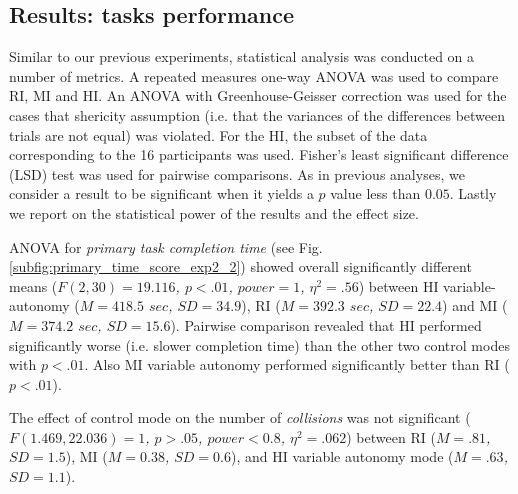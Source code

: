 \documentclass[a4paper,12pt,oneside,openright]{bhamthesis}
\begin{document}
 
\subsection{Results: tasks performance}
\label{chapter5:sim_results_system}
Similar to our previous experiments, statistical analysis was conducted on a number of metrics. A repeated measures one-way ANOVA was used to compare RI, MI and HI. An ANOVA with Greenhouse-Geisser correction was used for the cases that shericity assumption (i.e. that the variances of the differences between trials are not equal) was violated. For the HI, the subset of the data corresponding to the 16 participants was used. Fisher's least significant difference (LSD) test was used for pairwise comparisons. As in previous analyses, we consider a result to be significant when it yields a $p$ value less than $0.05$. Lastly we report on the statistical power of the results and the effect size.

ANOVA for \textit{primary task completion time} (see Fig. \ref{subfig:primary_time_score_exp2_2}) showed overall significantly different means (\textit{$F(2, 30) = 19.116$,  $p < .01$, $power = 1$, $\eta^2 = .56$}) between HI variable-autonomy (\textit{$M = 418.5$ $sec$, $SD = 34.9$}), RI (\textit{$M = 392.3$ $sec$, $SD = 22.4$}) and MI (\textit{$M = 374.2$ $sec$, $SD = 15.6$}). Pairwise comparison revealed that HI performed significantly worse (i.e. slower completion time) than the other two control modes with \textit{$p <.01$}. Also MI variable autonomy performed significantly better than RI (\textit{$p <.01$}). 

The effect of control mode on the number of \textit{collisions} was not significant (\textit{$F(1.469, 22.036) = 1$, $p > .05$, $power < 0.8$, $\eta^2 = .062$}) between RI (\textit{$M = .81$, $SD = 1.5$}), MI (\textit{$M = 0.38$, $SD = 0.6$}), and HI variable autonomy mode (\textit{$M = .63$, $SD = 1.1$}).
\end{document}
